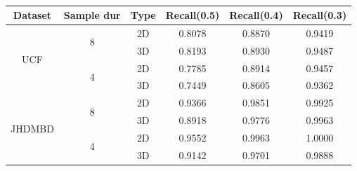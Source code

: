 \documentclass{report}
\begin{document}
\begin{table}[h]
  \centering
  \begin{tabular}{|c | c | c || c c c|}
    \hline
    \textbf{Dataset} & \textbf{Sample dur} & \textbf{Type} & \textbf{Recall(0.5)} &  \textbf{Recall(0.4)} &  \textbf{Recall(0.3)} \\
    \hline
    \multirow{4}{*}{UCF} & \multirow{2}{*}{8} & 2D & 0.8078 & 0.8870 & 0.9419 \\
    \cline{3-6}
    {} & {} & 3D & 0.8193 & 0.8930 & 0.9487 \\
    \cline{2-6}
    {} & \multirow{2}{*}{4}& 2D & 0.7785 & 0.8914 & 0.9457 \\
    \cline{3-6}
    {} & {} & 3D & 0.7449 & 0.8605 & 0.9362 \\
    \hline
    \multirow{4}{*}{JHDMBD} & \multirow{2}{*}{8} & 2D &  0.9366 & 0.9851 & 0.9925  \\
    \cline{3-6}
    {} & {} & 3D & 0.8918 & 0.9776 & 0.9963  \\ 
    \cline{2-6}
    {} & \multirow{2}{*}{4}& 2D & 0.9552 & 0.9963 & 1.0000 \\
    \cline{3-6}
    {} & {} & 3D & 0.9142 & 0.9701 & 0.9888  \\
    \hline
    
  \end{tabular}
  \caption{}
  \label{table:new_sample_reg}
\end{table}
\end{document}
